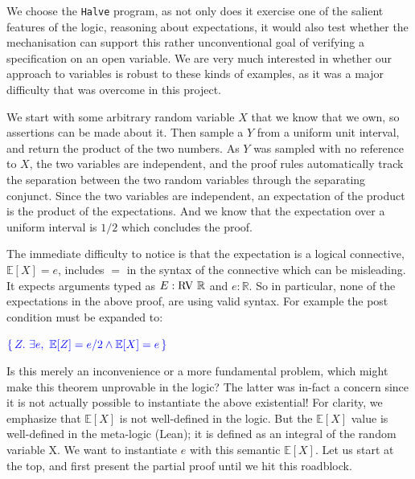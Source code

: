 We choose the \texttt{Halve} program, as not only does it exercise one of the salient features of the logic,
reasoning about expectations, it would also test whether the mechanisation can support this rather unconventional
goal of verifying a specification on an open variable. We are very much interested in whether our approach to variables
is robust to these kinds of examples, as it was a major difficulty that was overcome in this project.

We start with some arbitrary random variable $X$ that we know that we own, so assertions can be made about it. Then sample a $Y$ from a uniform unit interval, and return the
product of the two numbers. As $Y$ was sampled with no reference to $X$, the two variables are independent, and the proof rules automatically track the separation between the two random
variables through the separating conjunct. Since the two variables are independent, an expectation of the product is the product of the expectations. And we know that the expectation over
a uniform interval is $1/2$ which concludes the proof.

The immediate difficulty to notice is that the expectation is a logical connective, $\mathbb{E}[X]=e$, includes $=$
in the syntax of the connective which can be misleading. It expects arguments typed as $E : \mathrm{RV\ } \mathbb{R}$ and $e : \mathbb{R}$.
So in particular, none of the expectations in the above proof, are using valid syntax. For example the post
condition must be expanded to:


$\textcolor{blue}{\{\,Z.\ \exists e,\ \mathbb{E}[Z] = e/2 \land \mathbb{E}[X] = e\,\}}$







Is this merely an inconvenience or a more fundamental problem, which might make this theorem unprovable in the logic?
The latter was in-fact a concern since it is not actually possible to instantiate the above existential! For clarity,
we emphasize that $\mathbb{E}[X]$ is not well-defined in the logic. But the $\mathbb{E}[X]$ value is well-defined in the meta-logic (Lean); it is defined as an integral
of the random variable X. We want to instantiate $e$ with this semantic $\mathbb{E}[X]$. Let us start at the top, and first present the partial proof until we hit this roadblock.

